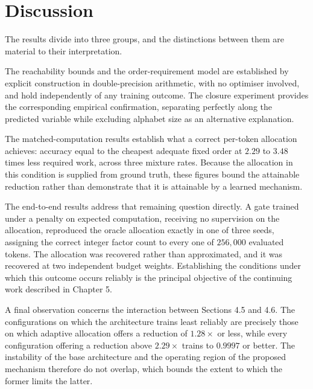 \section{Discussion}

The results divide into three groups, and the distinctions between them are
material to their interpretation.

The reachability bounds and the order-requirement model are established by
explicit construction in double-precision arithmetic, with no optimiser involved,
and hold independently of any training outcome. The closure experiment provides
the corresponding empirical confirmation, separating perfectly along the
predicted variable while excluding alphabet size as an alternative explanation.

The matched-computation results establish what a correct per-token allocation
achieves: accuracy equal to the cheapest adequate fixed order at $2.29$ to $3.48$
times less required work, across three mixture rates. Because the allocation in
this condition is supplied from ground truth, these figures bound the attainable
reduction rather than demonstrate that it is attainable by a learned mechanism.

The end-to-end results address that remaining question directly. A gate trained
under a penalty on expected computation, receiving no supervision on the
allocation, reproduced the oracle allocation exactly in one of three seeds,
assigning the correct integer factor count to every one of $256{,}000$ evaluated
tokens. The allocation was recovered rather than approximated, and it was
recovered at two independent budget weights. Establishing the conditions under
which this outcome occurs reliably is the principal objective of the continuing
work described in Chapter 5.

A final observation concerns the interaction between Sections 4.5 and 4.6. The
configurations on which the architecture trains least reliably are precisely
those on which adaptive allocation offers a reduction of $1.28\times$ or less,
while every configuration offering a reduction above $2.29\times$ trains to
$0.9997$ or better. The instability of the base architecture and the operating
region of the proposed mechanism therefore do not overlap, which bounds the
extent to which the former limits the latter.
\null
